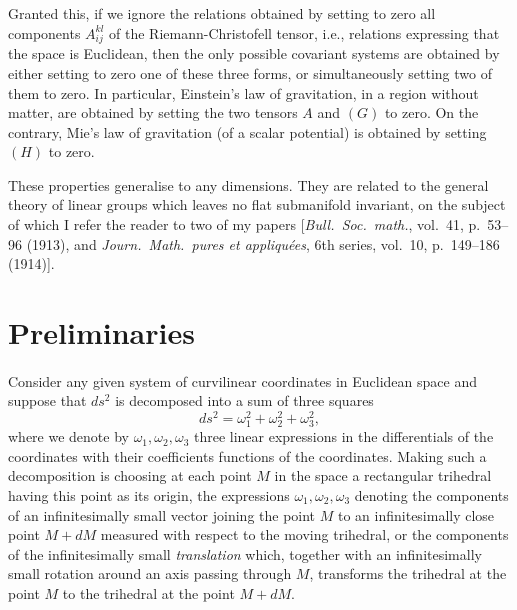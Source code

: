 \documentclass[leqno,12pt]{article}
\theoremstyle{shape1}
\theoremstyle{shape0}
\theoremstyle{shape2}
\theoremstyle{definition}
\begin{document}
Granted this, if we ignore the relations obtained by setting to zero all components $A^{kl}_{ij}$ of the Riemann-Christofell tensor, i.e., relations expressing that the space is Euclidean, then the only possible covariant systems are obtained by either setting to zero one of these three forms, or simultaneously setting two of them to zero. In particular, Einstein's law of gravitation, in a region without matter, are obtained by setting the two tensors $A$ and $(G)$ to zero. On the contrary, Mie's law of gravitation (of a scalar potential) is obtained by setting $(H)$ to zero.

These properties generalise to any dimensions. They are related to the general theory of linear groups which leaves no flat submanifold invariant, on the subject of which I refer the reader to two of my papers [\emph{Bull.\ Soc.\ math.}, vol.\ 41, p.\ 53--96 (1913), and \emph{Journ.\ Math.\ pures et appliquées}, 6th series, vol.\ 10, p.\ 149--186 (1914)].

\section{Preliminaries}
\label{sec:preliminaries}

\paragraph{}
\label{sec:1}
Consider any given system of curvilinear coordinates in Euclidean space and suppose that $ds^{2}$ is decomposed into a sum of three squares
\[
ds^{2}=\omega_{1}^{2}+\omega_{2}^{2}+\omega_{3}^{2},
\]
where we denote by $\omega_{1},\omega_{2},\omega_{3}$ three linear expressions in the differentials of the coordinates with their coefficients functions of the coordinates. Making such a decomposition is choosing at each point $M$ in the space a rectangular trihedral having this point as its origin, the expressions $\omega_{1},\omega_{2},\omega_{3}$ denoting the components of an infinitesimally small vector joining the point $M$ to an infinitesimally close point $M+dM$ measured with respect to the moving trihedral, or the components of the infinitesimally small \emph{translation} which, together with an infinitesimally small rotation around an axis passing through $M$, transforms the trihedral at the point $M$ to the trihedral at the point $M+dM$.
\end{document}
